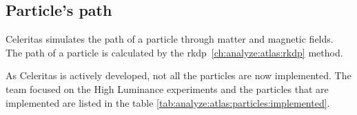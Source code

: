 \begin{table}[ht]
    \label{tab:analyze:atlas:rkdp:butcher}
\end{table}



\subsection{Particle's path}
\label{ch:analyze:atlas:path}

Celeritas simulates the path of a particle through matter and magnetic fields.
The path of a particle is calculated by the \acrshort{rkdp}~\ref{ch:analyze:atlas:rkdp} method.


As Celeritas is actively developed, not all the particles are now implemented.
The team focused on the High Luminance experiments and the particles that are
implemented are listed in the table \ref{tab:analyze:atlas:particles:implemented}.

